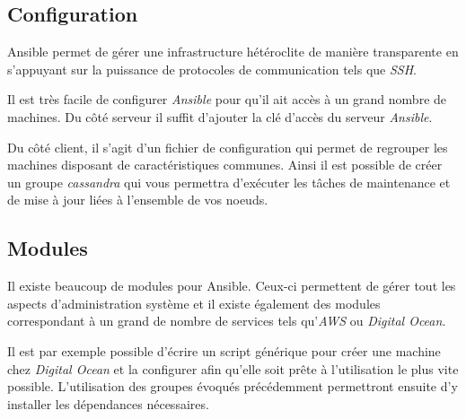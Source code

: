 \begin{Shaded}
\begin{Highlighting}[]
\NormalTok{$ } 
 \KeywordTok{|}  \NormalTok{=}\KeywordTok{>} \NormalTok{\{}
    \NormalTok{: }\NormalTok{,}
    \NormalTok{: }
\NormalTok{\}}
\end{Highlighting}
\end{Shaded}

\newpage

\subsection{Configuration}\label{configuration}

Ansible permet de gérer une infrastructure hétéroclite de manière
transparente en s'appuyant sur la puissance de protocoles de
communication tels que \emph{SSH}.

\bigskip

Il est très facile de configurer \emph{Ansible} pour qu'il ait accès à
un grand nombre de machines. Du côté serveur il suffit d'ajouter la clé
d'accès du serveur \emph{Ansible}.

\bigskip

Du côté client, il s'agit d'un fichier de configuration qui permet de
regrouper les machines disposant de caractéristiques communes. Ainsi il
est possible de créer un groupe \emph{cassandra} qui vous permettra
d'exécuter les tâches de maintenance et de mise à jour liées à
l'ensemble de vos noeuds.

\newpage

\subsection{Modules}\label{modules}

Il existe beaucoup de modules pour Ansible. Ceux-ci permettent de gérer
tout les aspects d'administration système et il existe également des
modules correspondant à un grand de nombre de services tels
qu'\emph{AWS} ou \emph{Digital Ocean}.

\bigskip

Il est par exemple possible d'écrire un script générique pour créer une
machine chez \emph{Digital Ocean} et la configurer afin qu'elle soit
prête à l'utilisation le plus vite possible. L'utilisation des groupes
évoqués précédemment permettront ensuite d'y installer les dépendances
nécessaires.

